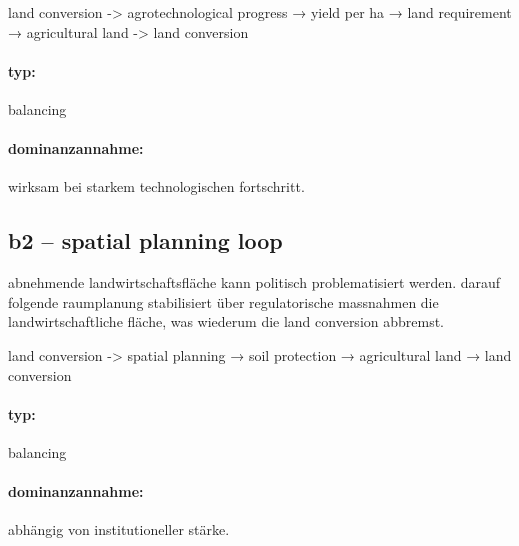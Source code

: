 \documentclass[11pt, a4paper, oneside]{scrartcl}
\begin{document}
land conversion -> agrotechnological progress → yield per ha → land requirement → agricultural land -> land conversion 

\paragraph{typ:}
balancing

\paragraph{dominanzannahme:}
wirksam bei starkem technologischen fortschritt.

\subsection{b2 – spatial planning loop}
abnehmende landwirtschaftsfläche kann politisch problematisiert werden. 
darauf folgende raumplanung stabilisiert über regulatorische massnahmen die landwirtschaftliche fläche,
was wiederum die land conversion abbremst.

land conversion -> spatial planning → soil protection → agricultural land → land conversion

\paragraph{typ:}
balancing

\paragraph{dominanzannahme:}
abhängig von institutioneller stärke.
\end{document}
